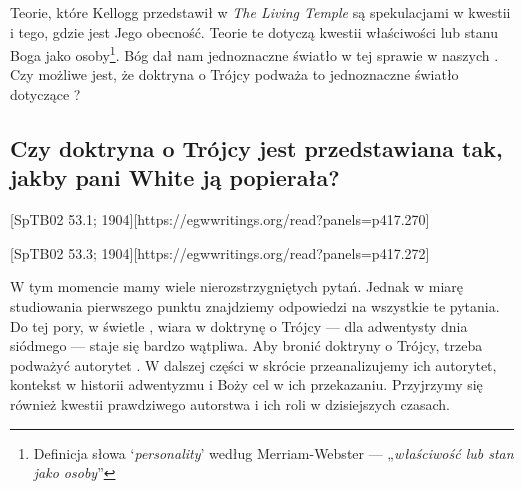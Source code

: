 Teorie, które Kellogg przedstawił w \textit{The Living Temple} są spekulacjami w kwestii  i tego, gdzie jest Jego obecność. Teorie te dotyczą kwestii właściwości lub stanu Boga jako osoby\footnote{Definicja słowa ‘\textit{personality}’ według Merriam-Webster — „\textit{właściwość lub stan jako osoby}”}. Bóg dał nam jednoznaczne światło w tej sprawie w naszych . Czy możliwe jest, że doktryna o Trójcy podważa to jednoznaczne światło dotyczące ?

\subsection*{Czy doktryna o Trójcy jest przedstawiana tak, jakby pani White ją popierała?}

[SpTB02 53.1; 1904][https://egwwritings.org/read?panels=p417.270]

[SpTB02 53.3; 1904][https://egwwritings.org/read?panels=p417.272]

W tym momencie mamy wiele nierozstrzygniętych pytań. Jednak w miarę studiowania pierwszego punktu  znajdziemy odpowiedzi na wszystkie te pytania. Do tej pory, w świetle , wiara w doktrynę o Trójcy — dla adwentysty dnia siódmego — staje się bardzo wątpliwa. Aby bronić doktryny o Trójcy, trzeba podważyć autorytet . W dalszej części w skrócie przeanalizujemy ich autorytet, kontekst w historii adwentyzmu i Boży cel w ich przekazaniu. Przyjrzymy się również kwestii prawdziwego autorstwa  i ich roli w dzisiejszych czasach.


